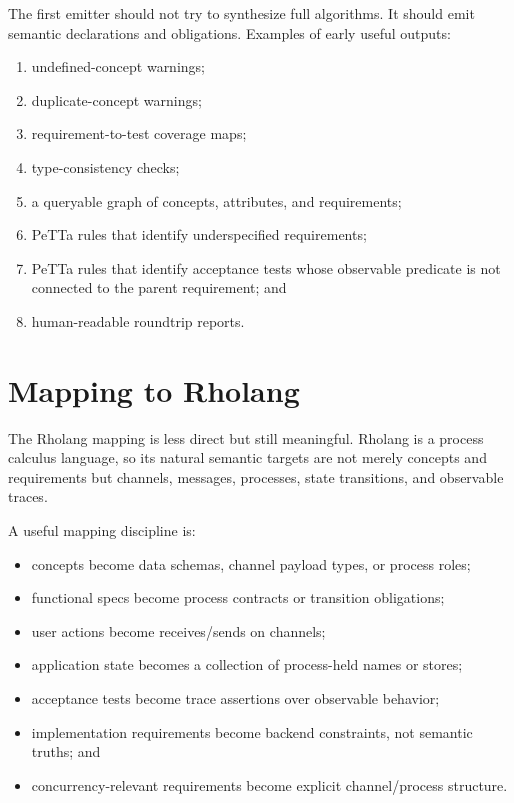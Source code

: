 \documentclass[11pt]{article}
\begin{document}
The first emitter should not try to synthesize full algorithms.  It should emit
semantic declarations and obligations.  Examples of early useful outputs:
\begin{enumerate}
  \item undefined-concept warnings;
  \item duplicate-concept warnings;
  \item requirement-to-test coverage maps;
  \item type-consistency checks;
  \item a queryable graph of concepts, attributes, and requirements;
  \item PeTTa rules that identify underspecified requirements;
  \item PeTTa rules that identify acceptance tests whose observable predicate is
        not connected to the parent requirement; and
  \item human-readable roundtrip reports.
\end{enumerate}

\section{Mapping to Rholang}

The Rholang mapping is less direct but still meaningful.  Rholang is a process
calculus language, so its natural semantic targets are not merely concepts and
requirements but channels, messages, processes, state transitions, and
observable traces.

A useful mapping discipline is:
\begin{itemize}
  \item concepts become data schemas, channel payload types, or process roles;
  \item functional specs become process contracts or transition obligations;
  \item user actions become receives/sends on channels;
  \item application state becomes a collection of process-held names or stores;
  \item acceptance tests become trace assertions over observable behavior;
  \item implementation requirements become backend constraints, not semantic
        truths; and
  \item concurrency-relevant requirements become explicit channel/process
        structure.
\end{itemize}
\end{document}
